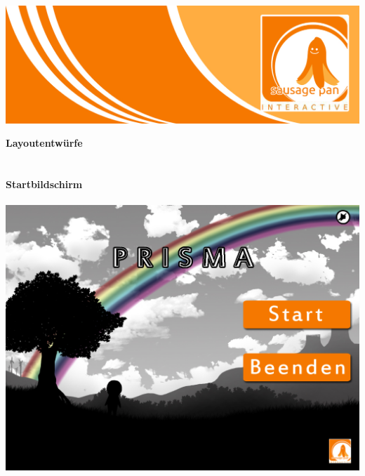 \documentclass[10pt,a4paper,notitlepage]{report}
\author{Sausage Pan}
\begin{document}
	\newcommand{\Eins}[1]{\color{orange}\textbf{{\Large#1}}} %
	\newcommand{\Zwei}[1]{\color{orange}\textbf{{\large#1}}} %
	\newcommand{\Drei}[1]{\color{orange}{\normalsize#1}} %
	\newcommand{\Text}{\color{schwarz}} %
	\newcommand{\Fusszeile}
	{\textit{{\footnotesize Eckert, Georg - Roscher, Philipp - Krien, Alexandra - Sinakow, Sergej - Blasberg, Bettina - Groß, Stephanie Sara}}} %
	\marginpar{\vspace{3.0mm} \color{orange}\rule{0.8mm}{53.3mm} \\[3mm] \color{hellorange}\rule{0.8mm}{170mm}}
	\begin{center}
		\includegraphics[width=160mm]{header2}
	\end{center}
	\Eins{Layoutentwürfe}\\
	\\
	\\
	\Zwei{Startbildschirm}\\
	\\
	\includegraphics[width=1\textwidth]{png/startbildschirm.jpg}\
\end{document}
